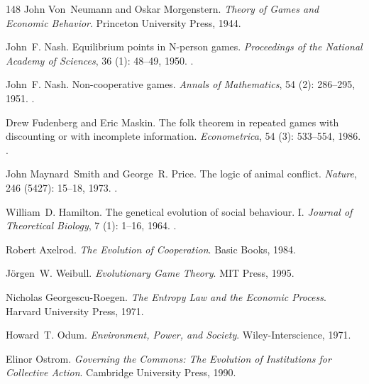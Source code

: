 \documentclass[11pt]{article}
\theoremstyle{plain}
\theoremstyle{definition}
\theoremstyle{remark}
\begin{document}
\begin{thebibliography}{148}
John Von~Neumann and Oskar Morgenstern.
\newblock \emph{Theory of Games and Economic Behavior}.
\newblock Princeton University Press, 1944.

John~F. Nash.
\newblock Equilibrium points in {N}-person games.
\newblock \emph{Proceedings of the National Academy of Sciences}, 36
  (1): 48--49, 1950.
\newblock {}.

John~F. Nash.
\newblock Non-cooperative games.
\newblock \emph{Annals of Mathematics}, 54 (2): 286--295,
  1951.
\newblock {}.

Drew Fudenberg and Eric Maskin.
\newblock The folk theorem in repeated games with discounting or with
  incomplete information.
\newblock \emph{Econometrica}, 54 (3): 533--554, 1986.
\newblock {}.

John Maynard~Smith and George~R. Price.
\newblock The logic of animal conflict.
\newblock \emph{Nature}, 246 (5427): 15--18, 1973.
\newblock {}.

William~D. Hamilton.
\newblock The genetical evolution of social behaviour. {I}.
\newblock \emph{Journal of Theoretical Biology}, 7 (1):
  1--16, 1964.
\newblock {}.

Robert Axelrod.
\newblock \emph{The Evolution of Cooperation}.
\newblock Basic Books, 1984.

J{\"o}rgen~W. Weibull.
\newblock \emph{Evolutionary Game Theory}.
\newblock MIT Press, 1995.

Nicholas Georgescu-Roegen.
\newblock \emph{The Entropy Law and the Economic Process}.
\newblock Harvard University Press, 1971.

Howard~T. Odum.
\newblock \emph{Environment, Power, and Society}.
\newblock Wiley-Interscience, 1971.

Elinor Ostrom.
\newblock \emph{Governing the Commons: The Evolution of Institutions for
  Collective Action}.
\newblock Cambridge University Press, 1990.


\end{thebibliography}
\end{document}
